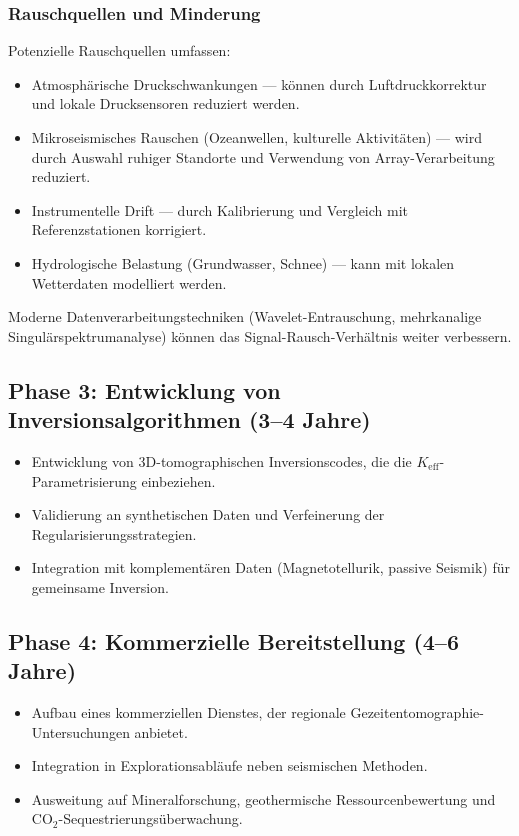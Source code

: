 \documentclass[12pt,a4paper]{article}
\theoremstyle{remark}
\newcommand{\Keff}{K_{\mathrm{eff}}}
\begin{document}
	\subsubsection{Rauschquellen und Minderung}
	
	Potenzielle Rauschquellen umfassen:
	\begin{itemize}
		\item Atmosphärische Druckschwankungen — können durch Luftdruckkorrektur und lokale Drucksensoren reduziert werden.
		\item Mikroseismisches Rauschen (Ozeanwellen, kulturelle Aktivitäten) — wird durch Auswahl ruhiger Standorte und Verwendung von Array-Verarbeitung reduziert.
		\item Instrumentelle Drift — durch Kalibrierung und Vergleich mit Referenzstationen korrigiert.
		\item Hydrologische Belastung (Grundwasser, Schnee) — kann mit lokalen Wetterdaten modelliert werden.
	\end{itemize}
	
	Moderne Datenverarbeitungstechniken (Wavelet-Entrauschung, mehrkanalige Singulärspektrumanalyse) können das Signal-Rausch-Verhältnis weiter verbessern.
	
	\subsection{Phase 3: Entwicklung von Inversionsalgorithmen (3–4 Jahre)}
	
	\begin{itemize}
		\item Entwicklung von 3D-tomographischen Inversionscodes, die die $\Keff$-Parametrisierung einbeziehen.
		\item Validierung an synthetischen Daten und Verfeinerung der Regularisierungsstrategien.
		\item Integration mit komplementären Daten (Magnetotellurik, passive Seismik) für gemeinsame Inversion.
	\end{itemize}
	
	\subsection{Phase 4: Kommerzielle Bereitstellung (4–6 Jahre)}
	
	\begin{itemize}
		\item Aufbau eines kommerziellen Dienstes, der regionale Gezeitentomographie-Untersuchungen anbietet.
		\item Integration in Explorationsabläufe neben seismischen Methoden.
		\item Ausweitung auf Mineralforschung, geothermische Ressourcenbewertung und CO$_2$-Sequestrierungsüberwachung.
	\end{itemize}
	
\end{document}
